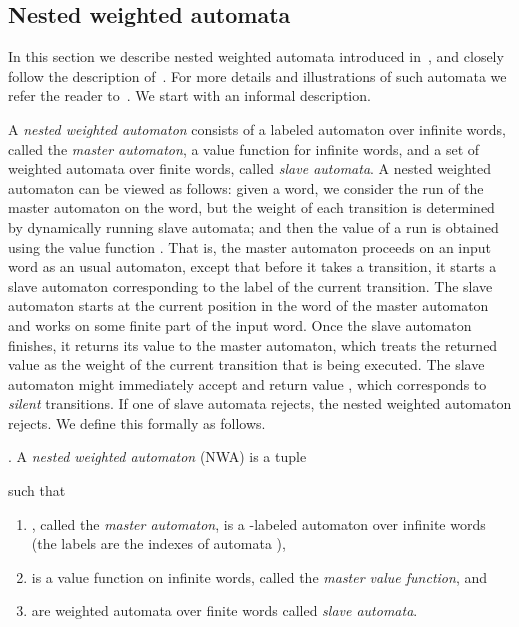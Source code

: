 \documentclass{lmcs}
\newcommand{\Paragraph}[1]{\noindent{\textbf{#1}}}
\begin{document}
\subsection{Nested weighted automata}
In this section we describe nested weighted automata introduced in~\cite{nested},
and closely follow the description of~\cite{nested}.
For more details and illustrations of such automata we refer the reader
to~\cite{nested}.
We start with an informal description.


\smallskip
{}
A \emph{nested weighted automaton} consists of a labeled automaton over infinite words,
called the \emph{master automaton}, a value function  for infinite words,
and a set of weighted automata over finite words, called \emph{slave automata}.
A nested weighted automaton can be viewed as follows:
given a word, we consider the run of the master automaton on the word,
but the weight of each transition is determined by dynamically running
slave automata; and then the value of a run is obtained using the
value function .
That is, the master automaton proceeds on an input word as an usual automaton,
except that before it takes a transition, it starts a slave automaton
corresponding to the label of the current transition.
The slave automaton starts at the current position in the word of the master automaton
and works on some finite part of the input word. Once the slave automaton finishes,
it returns its value to the master automaton, which treats the returned
value as the weight of the current transition that is being executed.
The slave automaton might immediately accept and return value ,
which corresponds to \emph{silent} transitions.
If one of slave automata rejects, the nested weighted automaton rejects.
We define this formally as follows.

\smallskip

\Paragraph{Nested weighted automata}.
A \emph{nested weighted automaton} (NWA)  is a tuple

such that

\begin{enumerate}
\item , called the \emph{master automaton}, is a -labeled automaton over infinite words
(the labels are the indexes of automata ),
\item  is a value function on infinite words, called the \emph{master value function}, and
\item  are weighted automata over finite words called \emph{slave automata}.
\end{enumerate}
\smallskip
\end{document}
